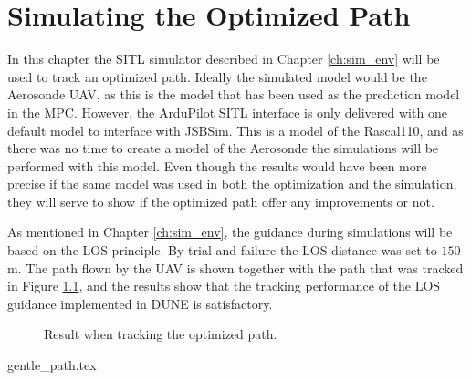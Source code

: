 \chapter{Simulating the Optimized Path}

In this chapter the SITL simulator described in Chapter \ref{ch:sim_env} will be used to track an optimized path. Ideally the simulated model would be the Aerosonde UAV, as this is the model that has been used as the prediction model in the MPC. However, the ArduPilot SITL interface is only delivered with one default model to interface with JSBSim. This is a model of the Rascal110, and as there was no time to create a model of the Aerosonde the simulations will be performed with this model. Even though the results would have been more precise if the same model was used in both the optimization and the simulation, they will serve to show if the optimized path offer any improvements or not.

As mentioned in Chapter \ref{ch:sim_env}, the guidance during simulations will be based on the LOS principle. By trial and failure the LOS distance was set to $150$m. The path flown by the UAV is shown together with the path that was tracked in Figure \ref{fig:sim_tracking}, and the results show that the tracking performance of the LOS guidance implemented in DUNE is satisfactory.

\begin{figure}
	\caption{Result when tracking the optimized path.}
	\label{fig:sim_tracking}
\end{figure}

{gentle_path.tex}
